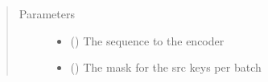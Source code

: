 \documentclass[letterpaper,10pt,english]{sphinxmanual}
\begin{document}
\begin{fulllineitems}
\begin{fulllineitems}
\label{\detokenize{dc_custom_model:src.domain_classifier.custom_model.CustomEncoderLayer.forward}}\begin{quote}\begin{description}
\item[{Parameters}] \leavevmode\begin{itemize}
\item {} 
\sphinxAtStartPar
{} () \textendash{} The sequence to the encoder

\item {} 
\sphinxAtStartPar
{} () \textendash{} The mask for the src keys per batch

\end{itemize}

\end{description}\end{quote}

\end{fulllineitems}


\end{fulllineitems}

\end{document}
